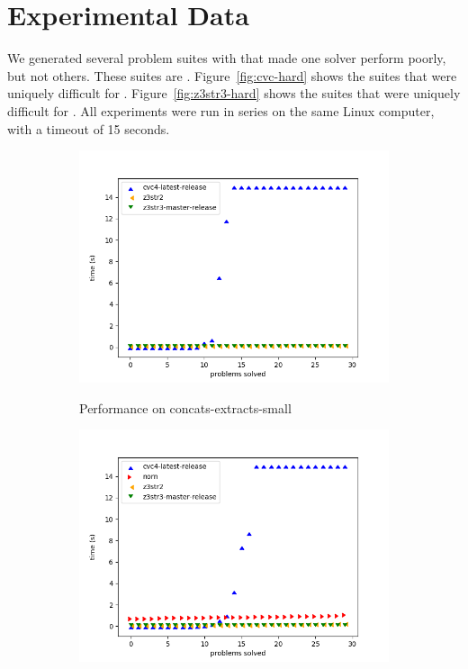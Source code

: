 \section{Experimental Data}
\label{sec:data}

    We generated several problem suites with \fuzzer{} that made one solver perform poorly, but not others. These suites are \theSuites{}. Figure~\ref{fig:cvc-hard} shows the suites that were uniquely difficult for \cvc{}. Figure~\ref{fig:z3str3-hard} shows the suites that were uniquely difficult for \us{}. All experiments were run in series on the same Linux computer, with a timeout of 15 seconds.

    \begin{figure}[H]
        \begin{subfigure}{.5\textwidth}
            \includegraphics[width=\textwidth]{data/graphs/concats-extracts-small.png}
            \label{fig:concats-extracts-small}
            \caption{Performance on concats-extracts-small}
        \end{subfigure}
        \begin{subfigure}{.5\textwidth}
            \includegraphics[width=\textwidth]{data/graphs/different-prefix.png}

\end{subfigure}
\end{figure}
